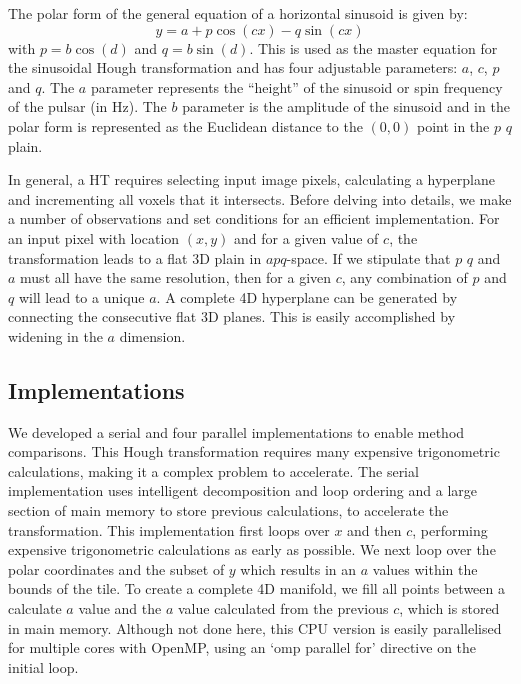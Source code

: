 The polar form of the general equation of a horizontal sinusoid is given by:
\begin{equation} \label{eq:masterPolar}
y = a + p \cos\left(cx\right) - q \sin \left( cx \right ) 
\end{equation}
with $ p = b \cos\left(d\right)$ and $ q =b \sin \left( d \right)$.
This is used as the master equation for the sinusoidal Hough transformation and has four adjustable parameters: $a$, $c$, $p$ and $q$.
The $a$ parameter represents the ``height'' of the sinusoid or spin frequency of the pulsar (in Hz).  
The $b$ parameter is the amplitude of the sinusoid and in the polar form is represented as the Euclidean distance to the $(0,0)$ point in the $p$ $q$ plain.

In general, a HT requires selecting input image pixels, calculating a hyperplane and incrementing all voxels that it intersects.
Before delving into details, we make a number of observations and set conditions for an efficient implementation.
For an input pixel with location $(x, y)$ and for a given value of $c$, the transformation leads to a flat 3D plain in $apq$-space.
If we stipulate that $p$ $q$ and $a$ must all have the same resolution, then for a given $c$, any combination of $p$ and $q$ will lead to a unique $a$.
A complete 4D hyperplane can be generated by connecting the consecutive flat 3D planes.
This is easily accomplished by widening in the $a$ dimension.

\subsection{Implementations}

We developed a serial and four parallel implementations to enable method comparisons.
This Hough transformation requires many expensive trigonometric calculations, making it a complex problem to accelerate.
The serial implementation uses intelligent decomposition and loop ordering and a large section of main memory to store previous calculations, to accelerate the transformation.
This implementation first loops over $x$ and then $c$, performing expensive trigonometric calculations as early as possible.
We next loop over the polar coordinates and the subset of $y$ which results in an $a$ values within the bounds of the tile.
To create a complete 4D manifold, we fill all points between a calculate $a$ value and the $a$ value calculated from the previous $c$, which is stored in main memory.
Although not done here, this CPU version is easily parallelised for multiple cores with OpenMP, using an `omp parallel for' directive on the initial loop.


